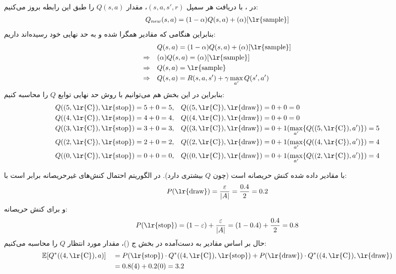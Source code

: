 \begin{ابجد}
\item در ، با دریافت هر سمپل $(s,a,s',r)$، مقدار $Q(s, a)$ را طبق این رابطه بروز می‌کنیم:
\begin{align*}
    Q_{new}(s, a) = (1 - \alpha)Q(s, a) + (\alpha)[\text{\lr{sample}}]
\end{align*}
بنابراین هنگامی که مقادیر همگرا شده و به حد نهایی خود رسیده‌اند داریم:
\begin{align*}
                      & Q(s, a) = (1 - \alpha)Q(s, a) + (\alpha)[\text{\lr{sample}}] \\
    \Rightarrow \quad & (\alpha)Q(s, a) = (\alpha)[\text{\lr{sample}}]               \\
    \Rightarrow \quad & Q(s, a) = \text{\lr{sample}}                                 \\
    \Rightarrow \quad & Q(s, a) = R(s,a,s') + \gamma \max_{a'} Q(s', a')
\end{align*}
بنابراین در این بخش هم می‌توانیم با روش  حد نهایی توابع $Q$ را محاسبه کنیم:
\begin{align*}
     & Q((5, \text{\lr{C}}), \text{\lr{stop}}) = 5 + 0 = 5, &  & Q((5, \text{\lr{C}}), \text{\lr{draw}}) = 0 + 0 = 0                                             \\
     & Q((4, \text{\lr{C}}), \text{\lr{stop}}) = 4 + 0 = 4, &  & Q((4, \text{\lr{C}}), \text{\lr{draw}}) = 0 + 0 = 0                                             \\
     & Q((3, \text{\lr{C}}), \text{\lr{stop}}) = 3 + 0 = 3, &  & Q((3, \text{\lr{C}}), \text{\lr{draw}}) = 0 + 1 (\max_{a'} \{ Q((5, \text{\lr{C}}), a') \}) = 5 \\
     & Q((2, \text{\lr{C}}), \text{\lr{stop}}) = 2 + 0 = 2, &  & Q((2, \text{\lr{C}}), \text{\lr{draw}}) = 0 + 1 (\max_{a'} \{ Q((4, \text{\lr{C}}), a') \}) = 4 \\
     & Q((0, \text{\lr{C}}), \text{\lr{stop}}) = 0 + 0 = 0, &  & Q((0, \text{\lr{C}}), \text{\lr{draw}}) = 0 + 1 (\max_{a'} \{ Q((2, \text{\lr{C}}), a') \}) = 4
\end{align*}

\item با مقادیر داده شده  کنش حریصانه است (چون $Q$ بیشتری دارد). در الگوریتم  احتمال کنش‌های غیرحریصانه برابر است با:
\begin{align*}
    P(\text{\lr{draw}}) = \frac{\varepsilon}{|A|} = \frac{0.4}{2} = 0.2
\end{align*}
و برای کنش حریصانه:
\begin{align*}
    P(\text{\lr{stop}}) = (1 - \varepsilon) + \frac{\varepsilon}{|A|} = (1 - 0.4) + \frac{0.4}{2} = 0.8
\end{align*}
حال بر اساس مقادیر به دست‌آمده در بخش ج ()، مقدار مورد انتظار $Q$ را محاسبه می‌کنیم:
\begin{align*}
     & \mathbb{E}[Q^*((4, \text{\lr{C}}), a)] &  & = P(\text{\lr{stop}}) \cdot Q^*((4, \text{\lr{C}}), \text{\lr{stop}}) + P(\text{\lr{draw}}) \cdot Q^*((4, \text{\lr{C}}), \text{\lr{draw}}) \\
     &                                        &  & = 0.8(4) + 0.2(0) = 3.2
\end{align*}


\end{ابجد}
